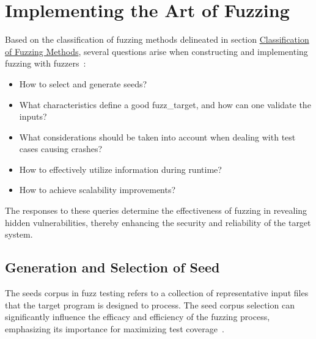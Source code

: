 



\section{Implementing the Art of Fuzzing}
Based on the classification of fuzzing methods delineated in
section \hyperref[sec:fuzzing_methods]{Classification of Fuzzing Methods},
several questions arise when constructing and implementing fuzzing with
fuzzers~\cite{liang2018fuzzing}:

\begin{itemize}
\item How to select and generate \gls{seeds}?
\item What characteristics define a good \gls{fuzz_target}, and how can one validate the inputs?
\item What considerations should be taken into account when dealing with test cases causing crashes?
\item How to effectively utilize information during runtime?
\item How to achieve scalability improvements?
\end{itemize}
The responses to these queries determine the effectiveness of fuzzing in
revealing hidden vulnerabilities, thereby enhancing the security and reliability of the target system.

\subsection{Generation and Selection of Seed}
The \gls{seeds} corpus in fuzz testing refers to a collection of representative input
files that the target program is designed to process. The seed corpus selection
can significantly influence the efficacy and efficiency of the fuzzing process,
emphasizing its importance for maximizing test coverage~\cite{herrera2021seed}.

